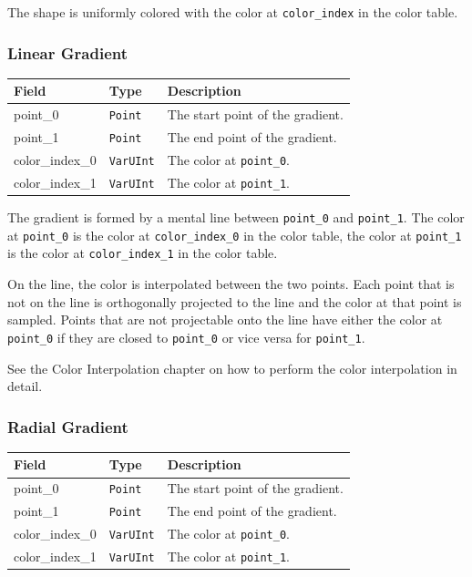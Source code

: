 \documentclass[]{article}
\begin{document}
The shape is uniformly colored with the color at \texttt{color\_index}
in the color table.

\hypertarget{linear-gradient}{\subsubsection{Linear Gradient}\label{linear-gradient}}

\begin{longtable}[]{@{}p{1in}p{1in}p{4in}@{}}
\toprule
Field & Type & Description \\
\midrule
\endhead
point\_0        & \texttt{Point}   & The start point of the gradient. \\
point\_1        & \texttt{Point}   & The end point of the gradient. \\
color\_index\_0 & \texttt{VarUInt} & The color at \texttt{point\_0}. \\
color\_index\_1 & \texttt{VarUInt} & The color at \texttt{point\_1}. \\
\bottomrule
\end{longtable}

The gradient is formed by a mental line between \texttt{point\_0} and
\texttt{point\_1}. The color at \texttt{point\_0} is the color at
\texttt{color\_index\_0} in the color table, the color at
\texttt{point\_1} is the color at \texttt{color\_index\_1} in the color
table.

On the line, the color is interpolated between the two points.
Each point that is not on the line is orthogonally projected to the line
and the color at that point is sampled. Points that are not projectable
onto the line have either the color at \texttt{point\_0} if they are
closed to \texttt{point\_0} or vice versa for \texttt{point\_1}.

See the \hypertarget{color-interpolation}{Color Interpolation} chapter on how to perform the color interpolation in detail.

\hypertarget{radial-gradient}{\subsubsection{Radial Gradient}\label{radial-gradient}}

\begin{longtable}[]{@{}p{1in}p{1in}p{4in}@{}}
\toprule
Field & Type & Description \\
\midrule
\endhead
point\_0        & \texttt{Point}   & The start point of the gradient. \\
point\_1        & \texttt{Point}   & The end point of the gradient. \\
color\_index\_0 & \texttt{VarUInt} & The color at \texttt{point\_0}. \\
color\_index\_1 & \texttt{VarUInt} & The color at \texttt{point\_1}. \\
\bottomrule
\end{longtable}
\end{document}
